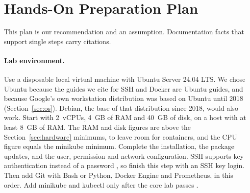 \section{Hands-On Preparation Plan}

This plan is our recommendation and an assumption. Documentation facts that support single steps carry citations.

\paragraph{Lab environment.}
Use a disposable local virtual machine with Ubuntu Server 24.04 LTS. We chose Ubuntu because the guides we cite for SSH and Docker are Ubuntu guides, and because Google's own workstation distribution was based on Ubuntu until 2018 \cite{google-cloud-blog} (Section~\ref{sec:os}). Debian, the base of that distribution since 2018, would also work. Start with 2~vCPUs, 4~GB of RAM and 40~GB of disk, on a host with at least 8~GB of RAM. The RAM and disk figures are above the Section~\ref{sec:hardware} minimums, to leave room for containers, and the CPU figure equals the minikube minimum. Complete the installation, the package updates, and the user, permission and network configuration. SSH supports key authentication instead of a password \cite{ubuntu-server-docs-how-to-security-openssh-server}, so finish this step with an SSH key login. Then add Git with Bash or Python, Docker Engine and Prometheus, in this order. Add minikube and kubectl only after the core lab passes \cite{minikube-sigs-k8s-docs-start}.

